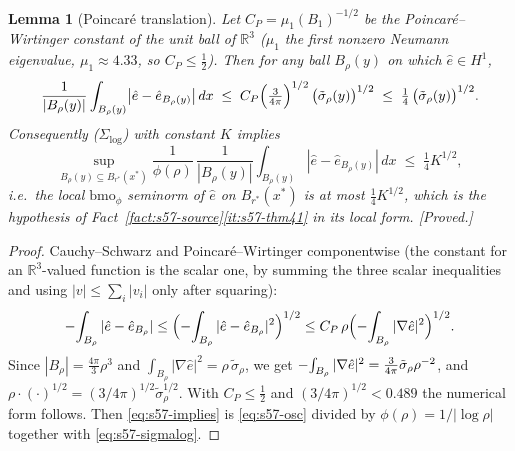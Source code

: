 \documentclass[11pt]{article}
\newtheorem{lemma}[theorem]{Lemma}
\theoremstyle{definition}
\theoremstyle{remark}
\newcommand{\R}{\mathbb{R}}
\newcommand{\Xint}{\mathop{\mathchoice{\vcenter{\hbox{$\displaystyle-$}}}%
  {\vcenter{\hbox{$\textstyle-$}}}%
  {\vcenter{\hbox{$\scriptstyle-$}}}%
  {\vcenter{\hbox{$\scriptscriptstyle-$}}}}\!\int}
\providecommand{\fint}{\Xint}
\begin{document}
\begin{lemma}[Poincar\'e translation]\label{lem:s57-poincare}
  Let $C_P=\mu_1(B_1)^{-1/2}$ be the Poincar\'e--Wirtinger constant of the
  unit ball of $\R^3$ ($\mu_1$ the first nonzero Neumann eigenvalue,
  $\mu_1\approx4.33$, so $C_P\leq\tfrac12$). Then for any ball $B_\rho(y)$ on
  which $\hat e\in H^1$,
  \begin{equation}\label{eq:s57-osc}
    \frac{1}{|B_\rho(y)|}\int_{B_\rho(y)}
      \bigl|\hat e-\hat e_{B_\rho(y)}\bigr|\,dx
    \;\leq\; C_P\Bigl(\tfrac{3}{4\pi}\Bigr)^{1/2}\,
      \bigl(\tilde\sigma_\rho(y)\bigr)^{1/2}
    \;\leq\;\tfrac14\,\bigl(\tilde\sigma_\rho(y)\bigr)^{1/2}.
  \end{equation}
  Consequently \textup{($\Sigma_{\log}$)} with constant $K$ implies
  \begin{equation}\label{eq:s57-implies}
    \sup_{B_\rho(y)\subseteq B_{r^*}(x^*)}\frac{1}{\phi(\rho)}\,
      \frac{1}{|B_\rho(y)|}\int_{B_\rho(y)}|\hat e-\hat e_{B_\rho(y)}|\,dx
    \;\leq\;\tfrac14 K^{1/2},
  \end{equation}
  i.e.\ the local $\mathrm{bmo}_\phi$ seminorm of $\hat e$ on $B_{r^*}(x^*)$
  is at most $\tfrac14K^{1/2}$, which is the hypothesis of
  Fact~\ref{fact:s57-source}\ref{it:s57-thm41} in its local form.
  \emph{[Proved.]}
\end{lemma}
\begin{proof}
  Cauchy--Schwarz and Poincar\'e--Wirtinger componentwise (the constant for an
  $\R^3$-valued function is the scalar one, by summing the three scalar
  inequalities and using $|v|\leq\sum_i|v_i|$ only after squaring):
  \[
    \fint_{B_\rho}|\hat e-\hat e_{B_\rho}|
    \leq\Bigl(\fint_{B_\rho}|\hat e-\hat e_{B_\rho}|^2\Bigr)^{1/2}
    \leq C_P\,\rho\Bigl(\fint_{B_\rho}|\nabla\hat e|^2\Bigr)^{1/2}.
  \]
  Since $|B_\rho|=\tfrac{4\pi}{3}\rho^3$ and
  $\int_{B_\rho}|\nabla\hat e|^2=\rho\,\tilde\sigma_\rho$, we get
  $\fint_{B_\rho}|\nabla\hat e|^2=\tfrac{3}{4\pi}\tilde\sigma_\rho\rho^{-2}$,
  and $\rho\cdot(\cdot)^{1/2}=(3/4\pi)^{1/2}\tilde\sigma_\rho^{1/2}$. With
  $C_P\leq\tfrac12$ and $(3/4\pi)^{1/2}<0.489$ the numerical form follows.
  Then \eqref{eq:s57-implies} is \eqref{eq:s57-osc} divided by
  $\phi(\rho)=1/|\log\rho|$ together with \eqref{eq:s57-sigmalog}.
\end{proof}
\end{document}
